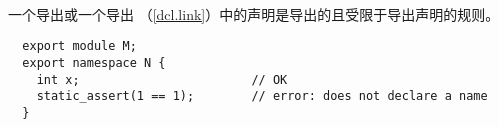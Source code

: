 \paragraph{} %
\begin{note}
  一个导出或一个导出
  （\ref{dcl.link}）中的声明是导出的且受限于导出声明的规则。

  \begin{example}
    \begin{lstlisting}
  export module M;
  export namespace N {
    int x;                        // OK
    static_assert(1 == 1);        // error: does not declare a name
  }
    \end{lstlisting}
  \end{example}

\end{note}
